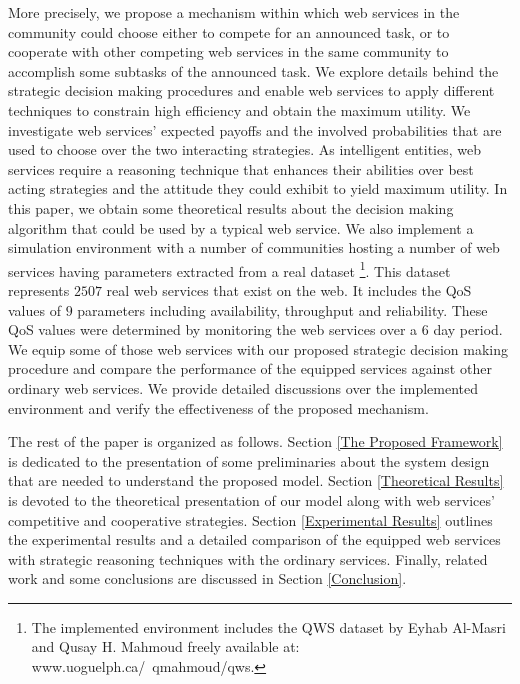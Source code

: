 \documentclass[runningheads,a4paper]{llncs}
\begin{document}
More precisely, we propose a mechanism within which web services
in the community could choose either to compete for an announced
task, or to cooperate with other competing web
services in the same community to accomplish some subtasks of the announced task. %
We explore details behind the strategic decision making procedures
and enable web services to apply different techniques to constrain
high efficiency and obtain the maximum utility. We investigate web
services' expected payoffs and the involved probabilities that are
used to choose over the two interacting
strategies. %
As intelligent entities, web services require a reasoning
technique that enhances their abilities over best acting
strategies and the attitude they could exhibit to yield maximum
utility. In this paper, we obtain some theoretical results about
the decision making algorithm that could be used by a typical web
service. We also implement a simulation environment with a number
of communities hosting a number of web services having parameters
extracted from a real dataset \cite{Almasri}\footnote{The
implemented environment includes the QWS dataset by Eyhab Al-Masri
and Qusay H. Mahmoud freely available at:
www.uoguelph.ca/~qmahmoud/qws.}. This dataset represents $2507$
real web services that exist on the web. It includes the QoS
values of $9$ parameters including availability, throughput and
reliability. These QoS values were determined by monitoring the
web services over a $6$ day period. We equip some of those web
services with our proposed strategic decision making procedure and
compare the performance of the equipped services against other
ordinary web services. We provide detailed discussions over the
implemented environment and verify the effectiveness of the
proposed mechanism.


The rest of the paper is organized as follows. Section \ref{The
Proposed Framework} is dedicated to the presentation of some
preliminaries about the system design that are needed to
understand the proposed model. Section \ref{Theoretical Results}
is devoted to the theoretical presentation of our model along with
web services' competitive and cooperative strategies. Section
\ref{Experimental Results} outlines the experimental results and a
detailed comparison of the equipped web services with strategic
reasoning techniques with the ordinary services. Finally, related
work and some conclusions are discussed in Section
\ref{Conclusion}.
\end{document}
